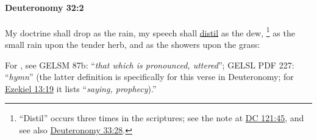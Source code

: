 		\paragraph{Deuteronomy 32:2} %
			\label{DEUTERONOMY-32-2}

			My doctrine shall drop as the rain, my speech shall \hyperref[DISTIL]{distil} as the dew,%
				\footnote{%
					\label{DEUTERONOMY-32-2-distil}%
					``Distil'' occurs three times in the scriptures; see the note at \hyperref[DC121-45]{DC 121:45}, and see also \hyperref[DEUTERONOMY-33-28]{Deuteronomy 33:28}.
					}
			as the small rain upon the tender herb, and as the showers upon the grass:

			\begin{framed}
			\scriptsize
				\begin{compactdesc}
					\item[BHS] 
					\item[LXX] 
						\begin{compactenum}
							\item For , see GELSM 87b: ``\textit{that which is pronounced, uttered}''; GELSL PDF 227: ``\textit{hymn}'' (the latter definition is specifically for this verse in Deuteronomy; for \hyperref[EZEKIEL-13-19]{Ezekiel 13:19} it lists ``\textit{saying, prophecy}).''
						\end{compactenum}
				\end{compactdesc}
			\end{framed}

